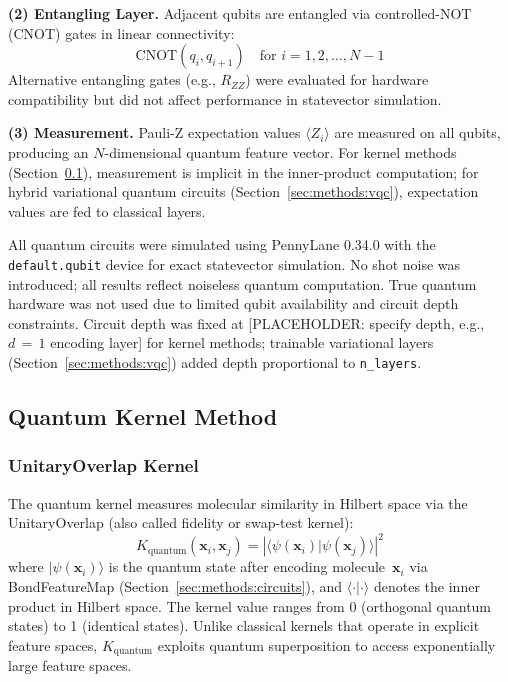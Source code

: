 \textbf{(2) Entangling Layer.} Adjacent qubits are entangled via controlled-NOT (CNOT) gates in linear connectivity:
%
\begin{equation}
\text{CNOT}(q_i, q_{i+1}) \quad \text{for } i = 1, 2, \ldots, N-1
\end{equation}
%
Alternative entangling gates (e.g., $R_{ZZ}$) were evaluated for hardware compatibility but did not affect performance in statevector simulation.

\textbf{(3) Measurement.} Pauli-Z expectation values $\langle Z_i \rangle$ are measured on all qubits, producing an $N$-dimensional quantum feature vector. For kernel methods (Section~\ref{sec:methods:kernel}), measurement is implicit in the inner-product computation; for hybrid variational quantum circuits (Section~\ref{sec:methods:vqc}), expectation values are fed to classical layers.

All quantum circuits were simulated using PennyLane 0.34.0\cite{Bergholm2018PennyLane} with the \texttt{default.qubit} device for exact statevector simulation. No shot noise was introduced; all results reflect noiseless quantum computation. True quantum hardware was not used due to limited qubit availability and circuit depth constraints. Circuit depth was fixed at [PLACEHOLDER: specify depth, e.g., $d\,=\,1$ encoding layer] for kernel methods; trainable variational layers (Section~\ref{sec:methods:vqc}) added depth proportional to \texttt{n\_layers}.

\subsection{Quantum Kernel Method}
\label{sec:methods:kernel}

\subsubsection{UnitaryOverlap Kernel}

The quantum kernel measures molecular similarity in Hilbert space via the UnitaryOverlap (also called fidelity or swap-test kernel):\cite{Havlicek2019QuantumKernel,Schuld2019QuantumML}
%
\begin{equation}
K_{\text{quantum}}(\mathbf{x}_i, \mathbf{x}_j) = \left| \langle \psi(\mathbf{x}_i) | \psi(\mathbf{x}_j) \rangle \right|^2
\label{eq:quantumkernel}
\end{equation}
%
where $|\psi(\mathbf{x}_i)\rangle$ is the quantum state after encoding molecule~$\mathbf{x}_i$ via BondFeatureMap (Section~\ref{sec:methods:circuits}), and $\langle \cdot | \cdot \rangle$ denotes the inner product in Hilbert space. The kernel value ranges from 0 (orthogonal quantum states) to 1 (identical states). Unlike classical kernels that operate in explicit feature spaces, $K_{\text{quantum}}$ exploits quantum superposition to access exponentially large feature spaces.


